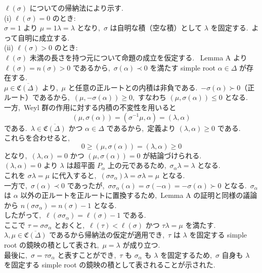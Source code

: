 \documentclass[uplatex,dvipdfmx]{jsarticle}
\begin{document}
\begin{myproof}
    $\ell(\sigma)$ についての帰納法により示す.~\\
    (i) $\ell(\sigma) = 0$ のとき:\\
    $\sigma = 1$ より $\mu = 1 \lambda = \lambda$ となり,~$\sigma$ は自明な積（空な積）として $\lambda$ を固定する.~よって自明に成立する.~\\
    (ii) $\ell(\sigma) > 0$ のとき:\\
    $\ell(\sigma)$ 未満の長さを持つ元について命題の成立を仮定する.~
    Lemma A より $\ell(\sigma) = n(\sigma) > 0$ であるから,~$\sigma(\alpha) \prec 0$ を満たす simple root $\alpha \in \Delta$ が存在する.~\\
    $\mu \in \overline{\mathfrak{C}(\Delta)}$ より,~$\mu$ と任意の正ルートとの内積は非負である.~$-\sigma(\alpha) \succ 0$（正ルート）であるから,~$(\mu, -\sigma(\alpha)) \ge 0$,~すなわち $(\mu, \sigma(\alpha)) \le 0$ となる.~\\
    一方,~Weyl 群の作用に対する内積の不変性を用いると\\
    \begin{equation*}
        (\mu, \sigma(\alpha)) = (\sigma^{-1}\mu, \alpha) = (\lambda, \alpha)
    \end{equation*}
    である.~$\lambda \in \overline{\mathfrak{C}(\Delta)}$ かつ $\alpha \in \Delta$ であるから,~定義より $(\lambda, \alpha) \ge 0$ である.~\\
    これらを合わせると,\\
    \begin{equation*}
        0 \ge (\mu, \sigma(\alpha)) = (\lambda, \alpha) \ge 0
    \end{equation*}
    となり,~$(\lambda, \alpha) = 0$ かつ $(\mu, \sigma(\alpha)) = 0$ が結論づけられる.~\\
    $(\lambda, \alpha) = 0$ より $\lambda$ は超平面 $P_\alpha$ 上の元であるため,~$\sigma_\alpha \lambda = \lambda$ となる.~\\
    これを $\sigma \lambda = \mu$ に代入すると,~$(\sigma \sigma_\alpha) \lambda = \sigma \lambda = \mu$ となる.~\\
    一方で,~$\sigma(\alpha) \prec 0$ であったが,~$\sigma \sigma_\alpha(\alpha) = \sigma(-\alpha) = -\sigma(\alpha) \succ 0$ となる.~$\sigma_\alpha$ は $\alpha$ 以外の正ルートを正ルートに置換するため,~Lemma A の証明と同様の議論から $n(\sigma \sigma_\alpha) = n(\sigma) - 1$ となる.~\\
    したがって,~$\ell(\sigma \sigma_\alpha) = \ell(\sigma) - 1$ である.~\\
    ここで $\tau = \sigma \sigma_\alpha$ とおくと,~$\ell(\tau) < \ell(\sigma)$ かつ $\tau \lambda = \mu$ を満たす.~$\lambda, \mu \in \overline{\mathfrak{C}(\Delta)}$ であるから帰納法の仮定が適用でき,~$\tau$ は $\lambda$ を固定する simple root の鏡映の積として表され,~$\mu = \lambda$ が成り立つ.~\\
    最後に,~$\sigma = \tau \sigma_\alpha$ と表すことができ,~$\tau$ も $\sigma_\alpha$ も $\lambda$ を固定するため,~$\sigma$ 自身も $\lambda$ を固定する simple root の鏡映の積として表されることが示された.~\\
\end{myproof}
\newpage
\end{document}
